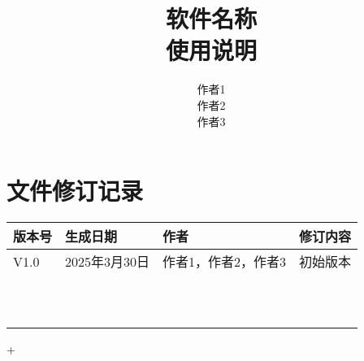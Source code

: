 \documentclass[12pt]{article}\usepackage[]{graphicx}\usepackage[]{xcolor}
\newcommand{\xiaoerhao}{\fontsize{18pt}{\baselineskip}\selectfont} %
\begin{document}
	\title{\xiaoerhao\textbf{{\Huge 软件名称 }\\
	使用说明
}} 
	\author{作者1		\\
		作者2		\\
		作者3		\\

	}
	\date{}
	\maketitle

\newpage
\section*{文件修订记录}

\renewcommand{\arraystretch}{1.5} %

\begin{center}
	\begin{tabular}{ | m{1.5cm}<{\centering}|m{4cm}<{\centering} | m{5cm}<{\centering} | m{3.5cm}<{\centering} |}
		\hline
		版本号 & 生成日期 & 作者 & 修订内容 \\ %
		\hline
		V1.0 & 2025年3月30日 & 作者1，作者2，作者3  & 初始版本 \\ %
		\hline
		&  &  &  \\ %
		\hline
		&  &  &  \\ %
		\hline
		&  &  &  \\ %
		\hline
		&  &  &  \\ %
		\hline
		&  &  &  \\ %
		\hline
		&  &  &  \\ %
		\hline
		&  &  &  \\ %
		\hline
		&  &  &  \\ %
		\hline
		&  &  &  \\ %
		\hline
		&  &  &  \\ %
		\hline
		&  &  &  \\ %
		\hline
	\end{tabular}
\end{center}


%
%
\newpage

\newpage

\newpage+

\end{document}
